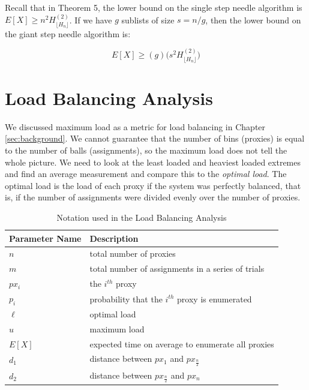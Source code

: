 Recall that in Theorem 5, the lower bound on the single step needle algorithm is $E[X] \geq n^2H^{(2)}_{\lfloor{H_n}\rfloor}$. If we have $g$ sublists of size $s=n/g$, then the lower bound on the giant step needle algorithm is:

$$E[X] \geq (g)\bigg(s^2H^{(2)}_{\lfloor{H_n}\rfloor}\bigg)$$

\label{sec:lb}
\section{Load Balancing Analysis}

We discussed maximum load as a metric for load balancing in Chapter \ref{sec:background}. We cannot guarantee that the number of bins (proxies) is equal to the number of balls (assignments), so the maximum load does not tell the whole picture. We need to look at the least loaded and heaviest loaded extremes and find an average measurement and compare this to the \textit{optimal load}. The optimal load is the load of each proxy if the system was perfectly balanced, that is, if the number of assignments were divided evenly over the number of proxies.

\begin{table}[h]
  \centering
	\begin{tabular}{ll}
	\hline
	\cline{1-2}
	Parameter Name    & Description  \\
	\hline
    $n$     & total number of proxies \\
    $m$     & total number of assignments in a series of trials \\
    $px_i$  & the $i^{th}$ proxy \\
    $p_i$   & probability that the $i^{th}$ proxy is enumerated \\
	$\ell$     & optimal load \\
	$u$     & maximum load \\
    $E[X]$  & expected time on average to enumerate all proxies \\
    $d_1$ & distance between $px_1$ and $px_{\frac{n}{2}}$ \\
    $d_2$ & distance between $px_{\frac{n}{2}}$ and $px_n$ \\
	\hline
	\end{tabular}
  \caption{Notation used in the Load Balancing Analysis}
  \label{tab:vars}
\end{table}

